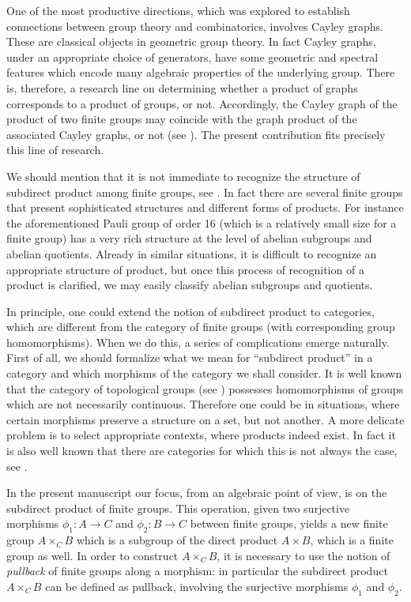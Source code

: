 \documentclass{amsart}
\theoremstyle{definition}
\numberwithin{equation}{section}
\begin{document}
One of the most productive directions, which was explored to establish connections between group theory and combinatorics, involves Cayley graphs. These are classical objects in geometric group theory. In fact Cayley graphs, under an appropriate choice of generators, have some geometric and spectral features which encode many algebraic properties of the underlying group. There is, therefore, a research line  on determining whether  a product of graphs corresponds to a product of groups, or not. Accordingly,  the Cayley graph of the  product of two finite groups may coincide with the graph product of the associated Cayley graphs, or not (see \cite{alon, donno1}). The present contribution fits precisely  this line of research.


We should mention that it is not immediate to  recognize the structure of subdirect product among finite groups, see \cite[Chapter A, \S 19, \S 20]{dh}. In fact  there are several finite groups that present sophisticated structures and different forms of products. For instance the aforementioned Pauli group of order 16 (which is a relatively small size for a finite group) has a very rich structure at the level of abelian subgroups and abelian quotients. Already in similar situations, it is difficult to recognize an appropriate structure of product, but  once this process of recognition of a product is clarified, we may easily classify abelian subgroups and quotients. %

In principle, one could extend the notion of subdirect product to categories, which are different from the category of finite groups (with corresponding group homomorphisms). When we do this,  a series of complications emerge naturally. First of all, we should formalize what we mean for ``subdirect product'' in a category and which morphisms of the category we shall consider. It is well known that the category of topological groups (see \cite{hofmor}) possesses homomorphisms of groups which are not necessarily continuous. Therefore one could be in situations, where certain morphisms preserve a structure on a set, but not another.  A more delicate problem is to select appropriate contexts, where products indeed exist. In fact it is also well known that there are categories for which this is not always the case, see \cite[Appendix 3]{hofmor}.  

In the present manuscript our focus, from an algebraic point of view, is on the subdirect product of finite groups. This operation, given two surjective morphisms $\phi_1:A \longrightarrow C$ and $\phi_2:B \longrightarrow C$ between finite groups, yields a new finite group $A \times_C B$ which is a subgroup of the direct product $A \times B$, which is a finite  group as well. In order to construct  $A \times_C B$, it is necessary to use the notion of  \textit{pullback} of finite groups along a morphism: in particular the subdirect product  $A\times_C B$ can be defined as pullback, involving the  surjective morphisms $\phi_1$ and $\phi_2$. 
\end{document}
